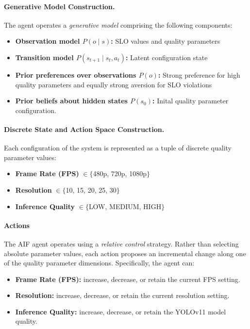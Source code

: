 \paragraph{Generative Model Construction.}
The agent operates a \textit{generative model} comprising the following components:
\begin{itemize}
  \item \textbf{Observation model \(P(o \mid s)\):} SLO values and quality parameters
  \item \textbf{Transition model \(P(s_{t+1} \mid s_t,a_t)\):} Latent configuration state
  \item \textbf{Prior preferences over observations \(P(o)\):} Strong preference for high quality parameters and equally strong aversion for SLO violations
  \item \textbf{Prior beliefs about hidden states \(P(s_0)\):} Inital quality parameter configuration.
\end{itemize}

\paragraph{Discrete State and Action Space Construction.}
Each configuration of the system is represented as a tuple of discrete quality parameter values:
\begin{itemize}
  \item \textbf{Frame Rate (FPS)} $\in \{$480p, 720p, 1080p$\}$
  \item \textbf{Resolution} $\in \{$10, 15, 20, 25, 30$\}$
  \item \textbf{Inference Quality} $\in \{$LOW, MEDIUM, HIGH$\}$
\end{itemize}

\paragraph{Actions}
The AIF agent operates using a \textit{relative control} strategy. Rather than selecting absolute parameter values, each action proposes an incremental change along one of the quality parameter dimensions. Specifically, the agent can:

\begin{itemize}
  \item \textbf{Frame Rate (FPS):} increase, decrease, or retain the current FPS setting.
  \item \textbf{Resolution:} increase, decrease, or retain the current resolution setting.
  \item \textbf{Inference Quality:} increase, decrease, or retain the YOLOv11 model quality.
\end{itemize}

